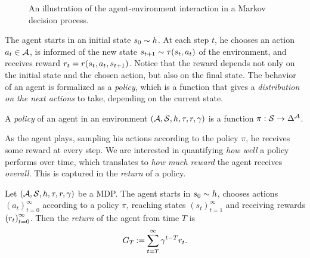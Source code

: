 \begin{figure}[t!]
	\centering
	\caption{An illustration of the agent-environment interaction in a Markov decision process.}
\end{figure}

The agent starts in an initial state $ s_0 \sim h $.
At each step $ t $, he chooses an action $ a_t \in \mathcal{A} $, is informed of the new state $ s_{t+1} \sim \tau\!\left(s_{t}, a_t\right) $ of the environment, and receives reward $ r_t = r\!\left(s_{t}, a_t, s_{t+1}\right) $.
Notice that the reward depends not only on the initial state and the chosen action, but also on the final state.
The behavior of an agent is formalized as a \emph{policy}, which is a function that gives a \emph{distribution on the next actions} to take, depending on the current state.

\begin{defi}[Policy]
	\label{def:policy}
	A \emph{policy} of an agent in an environment $ \left( \mathcal{A}, \mathcal{S}, h, \tau, r, \gamma \right) $ is a function $ \pi: \mathcal{S} \to \Delta^{\mathcal{A}} $.
\end{defi}

As the agent plays, sampling his actions according to the policy $ \pi $, he receives some reward at every step.
We are interested in quantifying \emph{how well} a policy performs over time, which translates to \emph{how much reward} the agent receives \emph{overall}.
This is captured in the \emph{return} of a policy.

\begin{defi}[Return]
	Let $ \left( \mathcal{A}, \mathcal{S}, h, \tau, r, \gamma \right) $ be a MDP.
	The agent starts in $ s_0 \sim h $, chooses actions $ \left( a_t \right)_{t=0}^\infty $ according to a policy $ \pi $, reaching states $ \left( s_t \right)_{t=1}^\infty $ and receiving rewards $ \left( r_t \right)_{t=0}^\infty $.
	Then the \emph{return} of the agent from time $ T $ is \[
		G_T \mathbin{:=} \sum_{t=T}^{\infty} \gamma^{t-T} r_t.
	\]
\end{defi}

